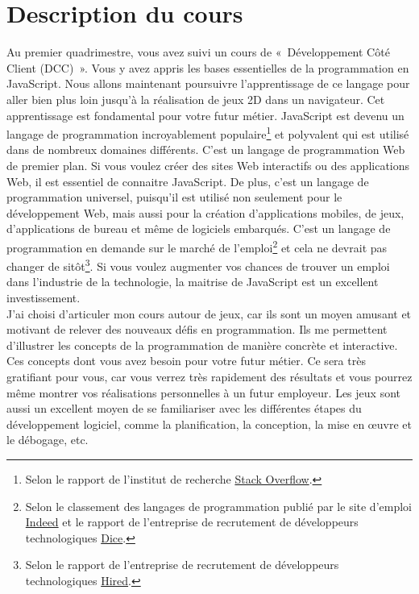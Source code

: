 \section{Description du cours}

Au premier quadrimestre, vous avez suivi un cours de «~Développement Côté Client (DCC)~». Vous y avez appris les bases essentielles de la programmation en JavaScript. Nous allons maintenant poursuivre l'apprentissage de ce langage pour aller bien plus loin jusqu'à la réalisation de jeux 2D dans un navigateur. Cet apprentissage est fondamental pour votre futur métier. JavaScript est devenu un langage de programmation incroyablement populaire\footnote{Selon le rapport de l'institut de recherche \href{https://insights.stackoverflow.com/survey}{Stack Overflow}.} et polyvalent qui est utilisé dans de nombreux domaines différents. C'est un langage de programmation Web de premier plan. Si vous voulez créer des sites Web interactifs ou des applications Web, il est essentiel de connaitre JavaScript. De plus, c'est un langage de programmation universel, puisqu'il est utilisé non seulement pour le développement Web, mais aussi pour la création d'applications mobiles, de jeux, d'applications de bureau et même de logiciels embarqués. C'est un langage de programmation en demande sur le marché de l'emploi\footnote{Selon le classement des langages de programmation publié par le site d'emploi \href{https://www.indeed.com/jobtrends/javascript.html}{Indeed} et le rapport de l'entreprise de recrutement de développeurs technologiques \href{https://www.dice.com}{Dice}.} et cela ne devrait pas changer de sitôt\footnote{Selon le rapport de l'entreprise de recrutement de développeurs technologiques \href{https://hired.com/}{Hired}.}. Si vous voulez augmenter vos chances de trouver un emploi dans l'industrie de la technologie, la maitrise de JavaScript est un excellent investissement.\\

J'ai choisi d'articuler mon cours autour de jeux, car ils sont un moyen amusant et motivant de relever des nouveaux défis en programmation. Ils me permettent d'illustrer les concepts de la programmation de manière concrète et interactive. Ces concepts dont vous avez besoin pour votre futur métier. Ce sera très gratifiant pour vous, car vous verrez très rapidement des résultats et vous pourrez même montrer vos réalisations personnelles à un futur employeur. Les jeux sont aussi un excellent moyen de se familiariser avec les différentes étapes du développement logiciel, comme la planification, la conception, la mise en œuvre et le débogage, etc.

